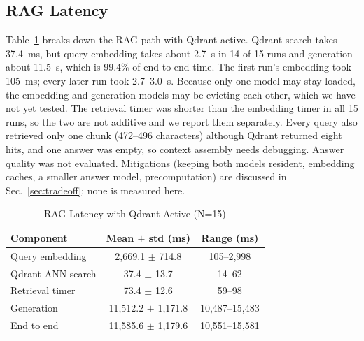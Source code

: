 \documentclass[conference]{IEEEtran}
\begin{document}
\subsection{RAG Latency}
Table~\ref{tab:rag} breaks down the RAG path with Qdrant active. Qdrant search takes 37.4~ms, but query embedding takes about 2.7~s in 14 of 15 runs and generation about 11.5~s, which is 99.4\% of end-to-end time. The first run's embedding took 105~ms; every later run took 2.7--3.0~s. Because only one model may stay loaded, the embedding and generation models may be evicting each other, which we have not yet tested. The retrieval timer was shorter than the embedding timer in all 15 runs, so the two are not additive and we report them separately. Every query also retrieved only one chunk (472--496 characters) although Qdrant returned eight hits, and one answer was empty, so context assembly needs debugging. Answer quality was not evaluated. Mitigations (keeping both models resident, embedding caches, a smaller answer model, precomputation) are discussed in Sec.~\ref{sec:tradeoff}; none is measured here.

\begin{table}[!t]
\caption{RAG Latency with Qdrant Active (N=15)}
\label{tab:rag}
\centering
\footnotesize
\begin{tabular}{lcc}
\toprule
\textbf{Component} & \textbf{Mean $\pm$ std (ms)} & \textbf{Range (ms)}\\
\midrule
Query embedding & 2,669.1 $\pm$ 714.8 & 105--2,998\\
Qdrant ANN search & 37.4 $\pm$ 13.7 & 14--62\\
Retrieval timer & 73.4 $\pm$ 12.6 & 59--98\\
Generation & 11,512.2 $\pm$ 1,171.8 & 10,487--15,483\\
End to end & 11,585.6 $\pm$ 1,179.6 & 10,551--15,581\\
\bottomrule
\end{tabular}
\end{table}
\end{document}

